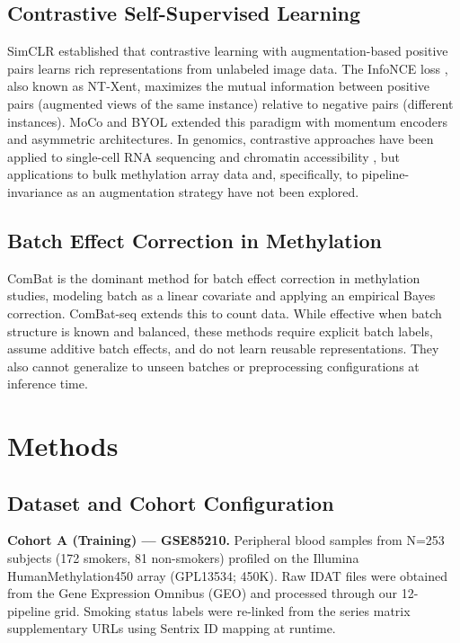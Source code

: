 \documentclass[conference]{IEEEtran}
\begin{document}
\subsection{Contrastive Self-Supervised Learning}
SimCLR \cite{chen2020} established that contrastive learning with augmentation-based positive pairs learns rich representations from unlabeled image data. The InfoNCE loss \cite{oord2018}, also known as NT-Xent, maximizes the mutual information between positive pairs (augmented views of the same instance) relative to negative pairs (different instances). MoCo \cite{he2020} and BYOL \cite{grill2020} extended this paradigm with momentum encoders and asymmetric architectures. In genomics, contrastive approaches have been applied to single-cell RNA sequencing \cite{zhang2022} and chromatin accessibility \cite{fang2023}, but applications to bulk methylation array data and, specifically, to pipeline-invariance as an augmentation strategy have not been explored.

\subsection{Batch Effect Correction in Methylation}
ComBat \cite{johnson2007} is the dominant method for batch effect correction in methylation studies, modeling batch as a linear covariate and applying an empirical Bayes correction. ComBat-seq \cite{zhang2020} extends this to count data. While effective when batch structure is known and balanced, these methods require explicit batch labels, assume additive batch effects, and do not learn reusable representations. They also cannot generalize to unseen batches or preprocessing configurations at inference time.

\section{Methods}

\subsection{Dataset and Cohort Configuration}

\textbf{Cohort A (Training) — GSE85210.} Peripheral blood samples from N=253 subjects (172 smokers, 81 non-smokers) profiled on the Illumina HumanMethylation450 array (GPL13534; 450K). Raw IDAT files were obtained from the Gene Expression Omnibus (GEO) and processed through our 12-pipeline grid. Smoking status labels were re-linked from the series matrix supplementary URLs using Sentrix ID mapping at runtime.
\end{document}

